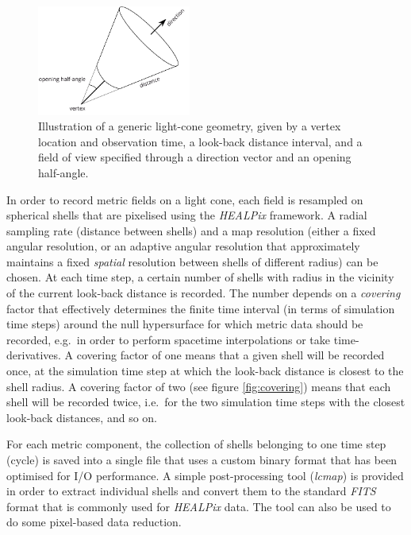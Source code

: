 \documentclass[a4paper,10pt]{article}
\begin{document}
\begin{figure}
\label{fig:pencilbeam}
 \includegraphics[width=0.45\textwidth]{pencilbeam}
 \caption{\small Illustration of a generic light-cone geometry, given by a vertex location and observation time, a look-back distance interval, and a
 field of view specified through a direction vector and an opening half-angle.}
\end{figure}

In order to record metric fields on a light cone, each field is resampled on spherical shells that are pixelised using the \textit{HEALPix} framework.
A radial sampling rate (distance between shells) and a map resolution (either a fixed angular resolution, or an adaptive angular resolution that approximately
maintains a fixed \textit{spatial} resolution between shells of different radius) can be chosen. At each time step, a certain number of shells with
radius in the vicinity of the current look-back distance is recorded. The number depends on a \textit{covering} factor that effectively determines the finite
time interval (in terms of simulation time steps) around the null hypersurface for which metric data should be recorded, e.g.\ in order to perform spacetime
interpolations or take time-derivatives. A covering factor of one means that a given shell will be recorded once, at the simulation time step at which the
look-back distance is closest to the shell radius. A covering factor of two (see figure \ref{fig:covering}) means that each shell will be recorded twice,
i.e.\ for the two simulation time steps with the closest look-back distances, and so on.

For each metric component, the collection of shells belonging to one time step (cycle) is saved into a single file that uses a custom binary format that has been
optimised for I/O performance. A simple post-processing tool (\textit{lcmap}) is provided in order to extract individual shells and convert them to the standard
\textit{FITS} format that is commonly used for \textit{HEALPix} data. The tool can also be used to do some pixel-based data reduction.
\end{document}
